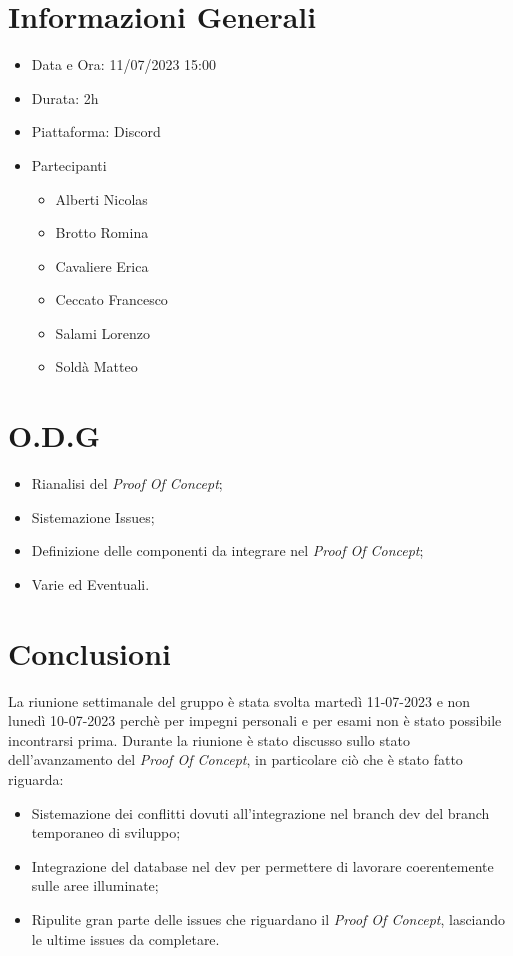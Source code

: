 \documentclass[a4paper, 12pt]{article}
\begin{document}
\makefrontpage

\section*{Informazioni Generali}
\begin{itemize}
    \item Data e Ora: 11/07/2023 15:00
    \item Durata: 2h
    \item Piattaforma: Discord
    \item Partecipanti
    \begin{itemize}
        \item Alberti Nicolas
        \item Brotto Romina
        \item Cavaliere Erica
        \item Ceccato Francesco
        \item Salami Lorenzo
        \item Soldà Matteo
    \end{itemize}
\end{itemize}

\section*{O.D.G}
\begin{itemize}
    \item Rianalisi del \textit{Proof Of Concept};
    \item Sistemazione Issues;
    \item Definizione delle componenti da integrare nel \textit{Proof Of Concept};
    \item Varie ed Eventuali.
\end{itemize}

\section*{Conclusioni}
La riunione settimanale del gruppo è stata svolta martedì 11-07-2023 e non lunedì 10-07-2023 perchè per impegni personali e per esami non è stato possibile incontrarsi prima.
Durante la riunione è stato discusso sullo stato dell'avanzamento del \textit{Proof Of Concept}, in particolare ciò che è stato fatto riguarda:
\begin{itemize}
    \item Sistemazione dei conflitti dovuti all'integrazione nel branch dev del branch temporaneo di sviluppo;
    \item Integrazione del database nel dev per permettere di lavorare coerentemente sulle aree illuminate;
    \item Ripulite gran parte delle issues che riguardano il \textit{Proof Of Concept}, lasciando le ultime issues da completare.
\end{itemize}
\end{document}
